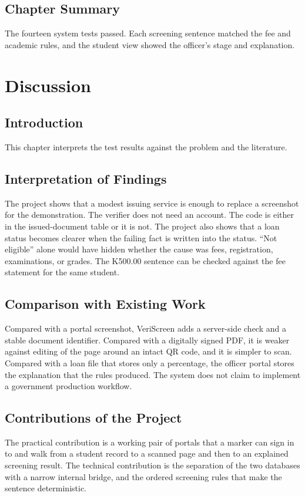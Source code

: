 \documentclass[12pt,a4paper]{report}
\begin{document}
\section{Chapter Summary}
The fourteen system tests passed. Each screening sentence matched the fee and academic rules, and the student view showed the officer's stage and explanation.

\chapter{Discussion}

\section{Introduction}
This chapter interprets the test results against the problem and the literature.

\section{Interpretation of Findings}
The project shows that a modest issuing service is enough to replace a screenshot for the demonstration. The verifier does not need an account. The code is either in the issued-document table or it is not. The project also shows that a loan status becomes clearer when the failing fact is written into the status. ``Not eligible'' alone would have hidden whether the cause was fees, registration, examinations, or grades. The K500.00 sentence can be checked against the fee statement for the same student.

\section{Comparison with Existing Work}
Compared with a portal screenshot, VeriScreen adds a server-side check and a stable document identifier. Compared with a digitally signed PDF, it is weaker against editing of the page around an intact QR code, and it is simpler to scan. Compared with a loan file that stores only a percentage, the officer portal stores the explanation that the rules produced. The system does not claim to implement a government production workflow.

\section{Contributions of the Project}
The practical contribution is a working pair of portals that a marker can sign in to and walk from a student record to a scanned page and then to an explained screening result. The technical contribution is the separation of the two databases with a narrow internal bridge, and the ordered screening rules that make the sentence deterministic.
\end{document}
